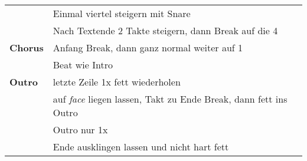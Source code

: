 \begin{tabular}{p{1.6cm}l}
	                & Einmal viertel steigern mit Snare                                        \\
	                & Nach Textende 2 Takte steigern, dann Break auf die 4                     \\
	\textbf{Chorus} & Anfang Break, dann ganz normal weiter auf 1                              \\
	                & Beat wie Intro                                                           \\
	\textbf{Outro}  & letzte Zeile 1x fett wiederholen                                         \\
	                & auf \textit{face} liegen lassen, Takt zu Ende Break, dann fett ins Outro \\
	                & Outro nur 1x                                                             \\
	                & Ende ausklingen lassen und nicht hart fett                               \\
\end{tabular}
